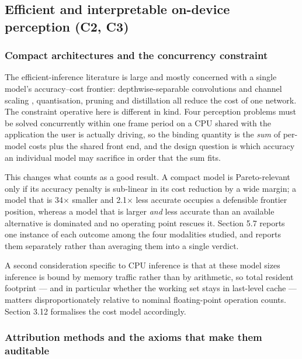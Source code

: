 \FloatBarrier

\subsection{Efficient and interpretable on-device perception (C2, C3)}

\subsubsection{Compact architectures and the concurrency constraint}

The efficient-inference literature is large and mostly concerned with a single model's accuracy--cost frontier: depthwise-separable convolutions and channel scaling , quantisation, pruning and distillation  all reduce the cost of one network. The constraint operative here is different in kind. Four perception problems must be solved concurrently within one frame period on a CPU shared with the application the user is actually driving, so the binding quantity is the \emph{sum} of per-model costs plus the shared front end, and the design question is which accuracy an individual model may sacrifice in order that the sum fits.

This changes what counts as a good result. A compact model is Pareto-relevant only if its accuracy penalty is sub-linear in its cost reduction by a wide margin; a model that is 34$\times$ smaller and 2.1$\times$ less accurate occupies a defensible frontier position, whereas a model that is larger \emph{and} less accurate than an available alternative is dominated and no operating point rescues it. Section 5.7 reports one instance of each outcome among the four modalities studied, and reports them separately rather than averaging them into a single verdict.

A second consideration specific to CPU inference is that at these model sizes inference is bound by memory traffic rather than by arithmetic, so total resident footprint --- and in particular whether the working set stays in last-level cache --- matters disproportionately relative to nominal floating-point operation counts. Section 3.12 formalises the cost model accordingly.

\subsubsection{Attribution methods and the axioms that make them auditable}

